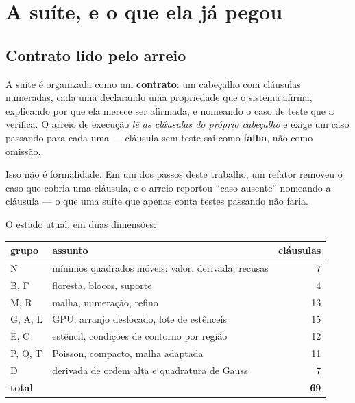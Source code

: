\section{A suíte, e o que ela já pegou}
\label{sec:verificacao}


\subsection{Contrato lido pelo arreio}

A suíte é organizada como um \textbf{contrato}: um cabeçalho com cláusulas
numeradas, cada uma declarando uma propriedade que o sistema afirma, explicando
por que ela merece ser afirmada, e nomeando o caso de teste que a verifica. O
arreio de execução \emph{lê as cláusulas do próprio cabeçalho} e exige um caso
passando para cada uma --- cláusula sem teste sai como \textbf{falha}, não como
omissão.

Isso não é formalidade. Em um dos passos deste trabalho, um refator removeu o caso
que cobria uma cláusula, e o arreio reportou ``caso ausente'' nomeando a cláusula
--- o que uma suíte que apenas conta testes passando não faria.

O estado atual, em duas dimensões:

\begin{center}
\begin{tabular}{llr}
\toprule
grupo & assunto & cláusulas \\
\midrule
N & mínimos quadrados móveis: valor, derivada, recusas & 7 \\
B, F & floresta, blocos, suporte & 4 \\
M, R & malha, numeração, refino & 13 \\
G, A, L & GPU, arranjo deslocado, lote de estênceis & 15 \\
E, C & estêncil, condições de contorno por região & 12 \\
P, Q, T & Poisson, compacto, malha adaptada & 11 \\
D & derivada de ordem alta e quadratura de Gauss & 7 \\
\midrule
\multicolumn{2}{l}{\textbf{total}} & \textbf{69} \\
\bottomrule
\end{tabular}
\end{center}

